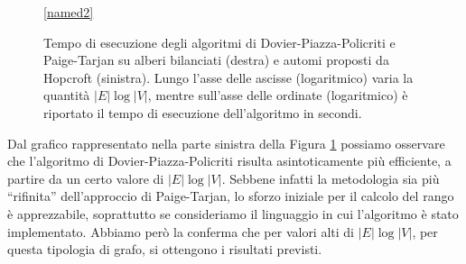 \begin{figure}[b!]
    \centering
    \begin{subfigure}[t]{0.49\textwidth}
    \end{subfigure}
    \hfill
    \begin{subfigure}[t]{0.49\textwidth}
    \end{subfigure}
    \ref*{named2}
    \caption{Tempo di esecuzione degli algoritmi di Dovier-Piazza-Policriti e Paige-Tarjan su alberi bilanciati (destra) e automi proposti da Hopcroft (sinistra). Lungo l'asse delle ascisse (logaritmico) varia la quantità $|E|\log|V|$, mentre sull'asse delle ordinate (logaritmico) è riportato il tempo di esecuzione dell'algoritmo in secondi.}
    \label{fig:pta_vs_fba}
\end{figure}

Dal grafico rappresentato nella parte sinistra della Figura \ref{fig:pta_vs_fba} possiamo osservare che l'algoritmo di Dovier-Piazza-Policriti risulta asintoticamente più efficiente, a partire da un certo valore di $|E| \log |V|$. Sebbene infatti la metodologia sia più ``rifinita'' dell'approccio di Paige-Tarjan, lo sforzo iniziale per il calcolo del rango è apprezzabile, soprattutto se consideriamo il linguaggio in cui l'algoritmo è stato implementato. Abbiamo però la conferma che per valori alti di $|E| \log |V|$, per questa tipologia di grafo, si ottengono i risultati previsti.

